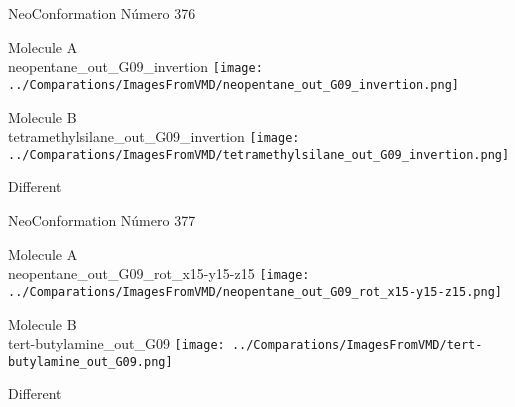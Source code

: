 \vtab[-2cm]
\begin{center}
{\large NeoConformation \tab Número 376}
\end{center}
\begin{multicols}{2}
\begin{center}
Molecule A \\ 
neopentane\_out\_G09\_invertion
\texttt{[image: ../Comparations/ImagesFromVMD/neopentane\_out\_G09\_invertion.png]}
\\
\vtab

\columnbreak
Molecule B \\ 
tetramethylsilane\_out\_G09\_invertion
\texttt{[image: ../Comparations/ImagesFromVMD/tetramethylsilane\_out\_G09\_invertion.png]}
\\
\vtab


\end{center}
\end{multicols}
\begin{center}
\vtab
\vtab
\textcolor{NavyBlue}{\Large Different}
\end{center}

 \newpage

\vtab[-2cm]
\begin{center}
{\large NeoConformation \tab Número 377}
\end{center}
\begin{multicols}{2}
\begin{center}
Molecule A \\ 
neopentane\_out\_G09\_rot\_x15-y15-z15
\texttt{[image: ../Comparations/ImagesFromVMD/neopentane\_out\_G09\_rot\_x15-y15-z15.png]}
\\
\vtab

\columnbreak
Molecule B \\ 
tert-butylamine\_out\_G09
\texttt{[image: ../Comparations/ImagesFromVMD/tert-butylamine\_out\_G09.png]}
\\
\vtab


\end{center}
\end{multicols}
\begin{center}
\vtab
\vtab
\textcolor{NavyBlue}{\Large Different}
\end{center}

 \newpage

